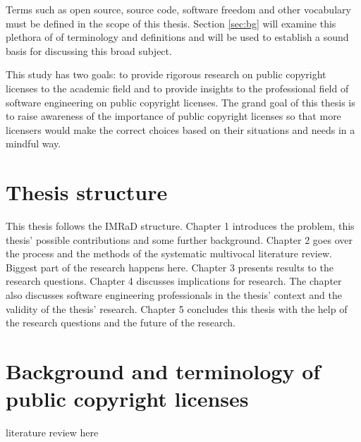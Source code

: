 Terms such as open source, source code, software freedom and other vocabulary must be defined in the scope of this thesis. Section \ref{sec:bg} will examine this plethora of of terminology and definitions and will be used to establish a sound basis for discussing this broad subject.

This study has two goals: to provide rigorous research on public copyright licenses to the academic field and to provide insights to the professional field of software engineering on public copyright licenses. The grand goal of this thesis is to raise awareness of the importance of public copyright licenses so that more licensers would make the correct choices based on their situations and needs in a mindful way.

\section{Thesis structure}
This thesis follows the IMRaD structure. Chapter 1 introduces the problem, this thesis' possible contributions and some further background. Chapter 2 goes over the process and the methods of the systematic multivocal literature review. Biggest part of the research happens here. Chapter 3 presents results to the research questions. Chapter 4 discusses implications for research. The chapter also discusses software engineering professionals in the thesis' context and the validity of the thesis' research. Chapter 5 concludes this thesis with the help of the research questions and the future of the research.

\section{Background and terminology of public copyright licenses}
literature review here
\label{sec:bg}